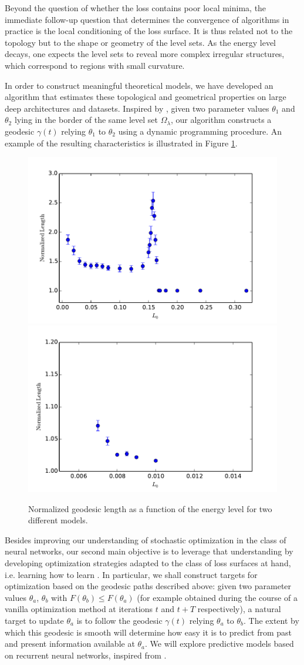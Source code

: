 \documentclass[11pt]{article}
\begin{document}
Beyond the question of whether the loss contains poor local minima, the immediate follow-up question that determines the convergence of algorithms in practice is the local conditioning of the loss surface. It is thus related not to the topology but to the shape or geometry of the level sets. As the energy level decays, one expects the level sets to reveal more complex irregular structures, which correspond to regions with small curvature.

In order to construct meaningful theoretical models, we have developed an algorithm that estimates these topological and geometrical properties on large deep architectures and datasets. Inspired by \cite{goodfellow2014qualitatively}, given two parameter values $\theta_1$ and $\theta_2$ lying in the border of the same level set $\Omega_\lambda$, our algorithm constructs a geodesic $\gamma(t)$ relying $\theta_1$ to $\theta_2$ using a dynamic programming procedure. An example of the resulting characteristics is illustrated in Figure \ref{figurelength}. 

\begin{figure}
\label{figurelength}
\centering
\includegraphics[width=.4\textwidth]{../Writeup/Plots/normlengthcubics}
\includegraphics[width=.4\textwidth]{../Writeup/Plots/normlengthMNIST}
\caption{Normalized geodesic length as a function of the energy level for two different models.}
\end{figure}

Besides improving our understanding of stochastic optimization in the class of neural networks, our second main objective is to leverage that understanding 
by developing optimization strategies adapted to the class of loss surfaces at hand, i.e. learning how to learn \cite{andrychowicz2016learning}. 
In particular, we shall construct targets for optimization based on the geodesic paths described above: given two parameter values 
$\theta_a$, $\theta_b$ with $F(\theta_b) \leq F(\theta_a)$ (for example obtained during the course of a vanilla optimization method at iterations $t$ and $t+T$ respectively), a natural target to update $\theta_a$ is to follow the geodesic $\gamma(t)$ relying $\theta_a$ to $\theta_b$. 
The extent by which this geodesic is smooth will determine how easy it is to predict from past and present information available at $\theta_a$. We will explore predictive models based on recurrent neural networks, inspired from \cite{andrychowicz2016learning}.
\end{document}
